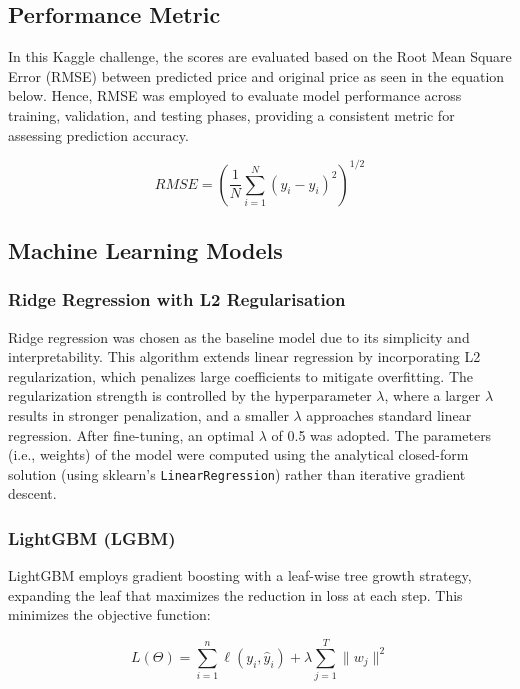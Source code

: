 \documentclass{article}
\begin{document}
\subsection{Performance Metric}

In this Kaggle challenge, the scores are evaluated based on the Root Mean Square Error (RMSE) between predicted price and original price as seen in the equation below. Hence, RMSE was employed to evaluate model performance across training, validation, and testing phases, providing a consistent metric for assessing prediction accuracy.

\begin{equation}
   RMSE = \left(\frac{1}{N}\sum_{i=1}^{N}(y_i - \hat{y}_i)^2\right)^{1/2}
\end{equation}

\subsection{Machine Learning Models}
\subsubsection{Ridge Regression with L2 Regularisation}

Ridge regression was chosen as the baseline model due to its simplicity and interpretability. This algorithm extends linear regression by incorporating L2 regularization, which penalizes large coefficients to mitigate overfitting. The regularization strength is controlled by the hyperparameter $\lambda$, where a larger $\lambda$ results in stronger penalization, and a smaller $\lambda$ approaches standard linear regression. After fine-tuning, an optimal $\lambda$ of 0.5 was adopted. The parameters (i.e., weights) of the model were computed using the analytical closed-form solution (using sklearn's \texttt{LinearRegression}) rather than iterative gradient descent.

\subsubsection{LightGBM (LGBM)}

LightGBM employs gradient boosting with a leaf-wise tree growth strategy, expanding the leaf that maximizes the reduction in loss at each step. This minimizes the objective function:

\begin{equation}
    L(\Theta) = \sum_{i=1}^n \ell(y_i, \hat{y}_i) + \lambda \sum_{j=1}^T \|w_j\|^2
\end{equation}
\end{document}
